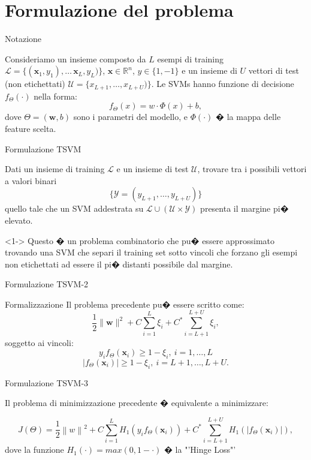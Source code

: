 \documentclass[mathserif]{beamer}
\begin{document}
\section{Formulazione del problema}

\begin{frame}{Notazione}
\begin{block}{}
Consideriamo un insieme composto da $L$ esempi di training $\mathcal{L}= \{ (\textbf{x}_1,y_1),\ldots\, \textbf{x}_L,y_L)\}$, $\textbf{x} \in \mathbb{R}^n$, $y \in \{1,-1\}$ e un insieme di $U$ vettori di test (non  etichettati) $\mathcal{U}=\{ x_{L+1},\ldots, x_{L+U})\}$. Le SVMs hanno 
funzione di decisione $f_\Theta(\cdot)$ nella forma:
	\[f_\Theta(x)= w\cdot\Phi(x)+b,
\]
dove $\Theta = (\textbf{w},b)$ sono i parametri del modello, e $\Phi(\cdot)$ � la mappa delle feature scelta.
\end{block}
\end{frame}

\begin{frame}{Formulazione TSVM}
\begin{block}{}
Dati un insieme di training $\mathcal{L}$ e un insieme di test $\mathcal{U}$, trovare tra i possibili vettori a valori binari
	\[\{\mathcal{Y}= (y_{L+1},\ldots,y_{L+U}) \}
\]
quello tale che un SVM addestrata su $\mathcal{L}\cup(\mathcal{U}\times\mathcal{Y})$ presenta il margine pi� elevato.
\end{block}
\begin{block}<1-> {}
Questo � un problema combinatorio che pu� essere approssimato trovando una SVM che separi il training set sotto vincoli che forzano gli esempi non etichettati ad essere il pi� distanti possibile dal margine.
\end{block}
\end{frame}



\begin{frame}{Formulazione TSVM-2}
\begin{block}{Formalizzazione}
Il problema precedente pu� essere scritto come:
	\[
	\frac{1}{2}\|\textbf{w}\|^2+C\sum_{i=1}^{L}\xi_i+C^*\sum_{i=L+1}^{L+U}\xi_i,
\]
soggetto ai vincoli:
	\[y_if_\Theta(\textbf{x}_i)\geq 1-\xi_i, \ i=1,\ldots, L
\]
	\[\left|f_\Theta(\textbf{x}_i)\right| \geq1-\xi_i, \ i=L+1,\ldots, L+U.
\]
\end{block}
\end{frame}


\begin{frame}{Formulazione TSVM-3}
\begin{block}{}
Il problema di minimizzazione precedente � equivalente a minimizzare:
	
\begin{equation}
	J(\Theta)= \frac{1}{2}\left\|w\right\|^2+C\sum_{i=1}^{L}H_1(y_if_\Theta(\textbf{x}_i))+C^*\sum_{i=L+1}^{L+U}H_1(\left|f_\Theta(\textbf{x}_i)\right|),
\end{equation}
dove la funzione $H_1(\cdot)=max(0,1-\cdot)$ � la "'Hinge Loss"'
\end{block}
\end{frame}
\end{document}
